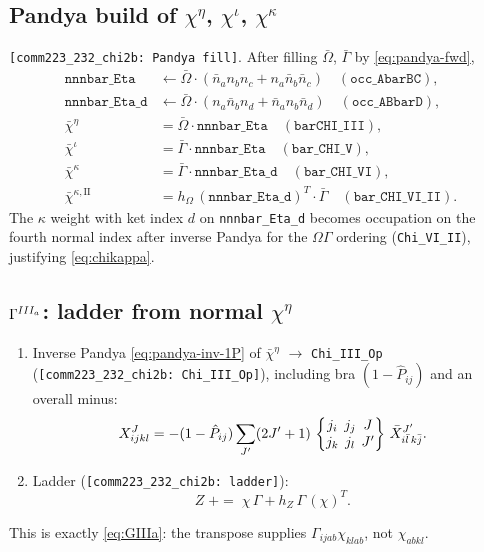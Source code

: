 \documentclass[enabledeprecatedfontcommands]{scrartcl}
\newcommand{\codename}[1]{\texttt{#1}}
\newcommand{\coderef}[1]{\textcolor{codeblue}{\texttt{[#1]}}}
\newcommand{\MyRomanNum}[1]{%
  \ifcase#1\or I\or II\or III\or IV\or V\or VI\or VII\or VIII\or IX\or X\else #1\fi}
\newcommand{\sixj}[6]{\begingroup\setlength{\arraycolsep}{0.2em}%
  \begin{Bmatrix} #1 & #2 & #3 \\ #4 & #5 & #6 \end{Bmatrix}\endgroup}
\begin{document}
\subsection{Pandya build of $\chi^\eta$, $\chi^\iota$, $\chi^\kappa$}
\label{sec:code-pandya-chi}

\coderef{comm223\_232\_chi2b: Pandya fill}.
After filling $\bar\Omega$, $\bar\Gamma$ by \eqref{eq:pandya-fwd},
\begin{align}
  \mathtt{nnnbar\_Eta}
    &\leftarrow\bar\Omega\cdot
      (\bar n_a n_b n_c+n_a\bar n_b\bar n_c)
      \quad(\codename{occ\_AbarBC}),\\
  \mathtt{nnnbar\_Eta\_d}
    &\leftarrow\bar\Omega\cdot
      (n_a\bar n_b n_d+\bar n_a n_b\bar n_d)
      \quad(\codename{occ\_ABbarD}),\\
  \bar\chi^\eta
    &=\bar\Omega\cdot\mathtt{nnnbar\_Eta}
      \quad(\codename{barCHI\_III}),\\
  \bar\chi^\iota
    &=\bar\Gamma\cdot\mathtt{nnnbar\_Eta}
      \quad(\codename{bar\_CHI\_V}),\\
  \bar\chi^\kappa
    &=\bar\Gamma\cdot\mathtt{nnnbar\_Eta\_d}
      \quad(\codename{bar\_CHI\_VI}),\\
  \bar\chi^{\kappa,\mathrm{II}}
    &=h_\Omega\,(\mathtt{nnnbar\_Eta\_d})^{T}\cdot\bar\Gamma
      \quad(\codename{bar\_CHI\_VI\_II}).
\end{align}
The $\kappa$ weight with ket index $d$ on \codename{nnnbar\_Eta\_d} becomes
occupation on the fourth normal index after inverse Pandya for the
$\Omega\Gamma$ ordering (\codename{Chi\_VI\_II}), justifying \eqref{eq:chikappa}.

\subsection{$\Gamma^{\MyRomanNum{3}_a}$: ladder from normal $\chi^\eta$}
\label{sec:code-GIIIa}

\begin{enumerate}
  \item Inverse Pandya \eqref{eq:pandya-inv-1P} of $\bar\chi^\eta$
    $\to$ \codename{Chi\_III\_Op} (\coderef{comm223\_232\_chi2b: Chi\_III\_Op}), including
    bra $(1-\hat P_{ij})$ and an overall minus:
    \[
      X^{J}_{ijkl}=-(1-\hat P_{ij})\sum_{J'}(2J'+1)\,
      \sixj{j_i}{j_j}{J}{j_k}{j_l}{J'}\,
      \bar X^{J'}_{i\bar l\,k\bar j}.
    \]
  \item Ladder (\coderef{comm223\_232\_chi2b: ladder}):
  \begin{equation}
    Z\;{+}{=}\;
    \chi\,\Gamma
   +h_Z\,\Gamma\,(\chi)^{T}.
  \end{equation}
\end{enumerate}
This is exactly \eqref{eq:GIIIa}: the transpose supplies
$\Gamma_{ijab}\chi_{klab}$, not $\chi_{abkl}$.
\end{document}

